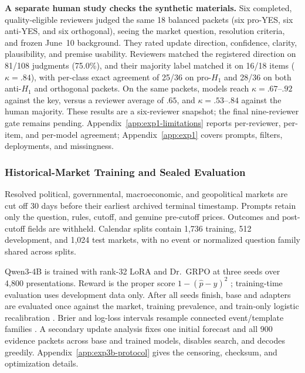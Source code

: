 \textbf{A separate human study checks the synthetic materials.} Six completed,
quality-eligible reviewers judged the same 18 balanced packets (six pro-YES, six
anti-YES, and six orthogonal), seeing the market question, resolution criteria,
and frozen June~10 background. They rated update direction, confidence, clarity,
plausibility, and premise usability. Reviewers matched the registered direction
on 81/108 judgments (75.0\%), and their majority label matched it on 16/18 items
($\kappa=.84$), with per-class exact agreement of 25/36 on pro-$H_1$ and 28/36
on both anti-$H_1$ and orthogonal packets. On the same packets, models reach
$\kappa=.67$--$.92$ against the key, versus a reviewer average of $.65$, and
$\kappa=.53$--$.84$ against the human majority. These results are a six-reviewer
snapshot; the final nine-reviewer gate remains pending. Appendix~\ref{app:exp1-limitations}
reports per-reviewer, per-item, and per-model agreement; Appendix~\ref{app:exp1}
covers prompts, filters, deployments, and missingness.

\subsubsection{Historical-Market Training and Sealed Evaluation}
\label{sec:methods-exp4-polymarket}

Resolved political, governmental, macroeconomic, and geopolitical markets are cut
off 30 days before their earliest archived terminal timestamp. Prompts retain only
the question, rules, cutoff, and genuine pre-cutoff prices. Outcomes and post-cutoff
fields are withheld. Calendar splits contain 1,736 training, 512 development, and
1,024 test markets, with no event or normalized question family shared across
splits.

Qwen3-4B \citep{qwen2025qwen3} is trained with rank-32 LoRA
\citep{hu2022lora} and Dr.~GRPO \citep{liu2025understanding} at three seeds over
4,800 presentations. Reward is the proper score $1-(\hat p-y)^2$
\citep{brier1950verification}; training-time evaluation uses development data only.
After all seeds finish, base and adapters are evaluated once against the market,
training prevalence, and train-only logistic recalibration
\citep{dawid1982well}. Brier and log-loss
intervals resample connected event/template families
\citep{brier1950verification,good1952rational}. A secondary update analysis fixes
one initial forecast and all 900 evidence packets across base and trained models,
disables search, and decodes greedily. Appendix~\ref{app:exp3b-protocol} gives the
censoring, checksum, and optimization details.
